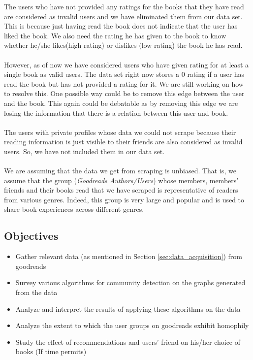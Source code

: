 \documentclass[11pt]{article}
\begin{document}
The users who have not provided any ratings for the books that they have read are considered as invalid users and we have eliminated them from our data set. This is because just having read the book does not indicate that the user has liked the book. We also need the rating he has given to the book to know whether he/she likes(high rating) or dislikes (low rating) the book he has read.\\\\
However, as of now we have considered users who have given rating for at least a single book as valid users. The data set right now stores a 0 rating if a user has read the book but has not provided a rating for it. We are still working on how to resolve this. One possible way could be to remove this edge between the user and the book. This again could be debatable as by removing this edge we are losing the information that there is a relation between this user and book.\\\\
The users with private profiles whose data we could not scrape because their reading information is just visible to their friends are also considered as invalid users. So, we have not included them in our data set.\\\\
We are assuming that the data we get from scraping is unbiased. That is, we assume that the group ({\it Goodreads Authors/Users}) whose members, members' friends and their books read that we have scraped is representative of readers from various genres. Indeed, this group is very large and popular and is used to share book experiences across different genres.

\subsection{Objectives}

\begin{itemize}
\item[\checkmark] Gather relevant data (as mentioned in Section \ref{sec:data_acquisition}) from goodreads
\item[\checkmark] Survey various algorithms for community detection on the graphs generated from the data
\item[\checkmark] Analyze and interpret the results of applying these algorithms on the data 
\item[\checkmark] Analyze the extent to which the user groups on goodreads exhibit homophily
\item Study the effect of recommendations and users' friend on his/her choice of books (If time permits)
\end{itemize}
\end{document}
